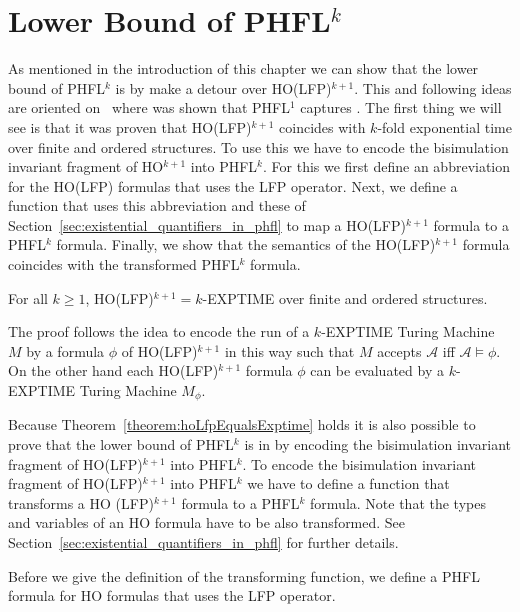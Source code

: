 
\section{Lower Bound of PHFL$^k$}\label{sec:lowerBoundOfPhfl}

As mentioned in the introduction of this chapter we can show that the lower bound of PHFL$^k$ is  by
make a detour over HO(LFP)$^{k+1}$. This and following ideas are oriented on~\cite{lange2014capturing} where was
shown that PHFL$^1$ captures . The first thing we will see is that it was proven that HO(LFP)$^{k +
1}$ coincides with $k$-fold exponential time over finite and ordered structures. To use this we have to encode the
bisimulation invariant fragment of HO$^{k+1}$ into PHFL$^k$. For this we first define an abbreviation for the HO(LFP)
formulas that uses the LFP operator. Next, we define a function that uses this abbreviation and these of
Section~\ref{sec:existential_quantifiers_in_phfl} to map a HO(LFP)$^{k+1}$ formula to a PHFL$^k$ formula. Finally, we
show that the semantics of the HO(LFP)$^{k+1}$ formula coincides with the transformed PHFL$^k$ formula.

\begin{theorem}{\cite{freireMartins2011descriptive}}\label{theorem:hoLfpEqualsExptime}
    For all $k \geq 1$, HO(LFP)$^{k + 1} = k$-EXPTIME over finite and ordered structures.
\end{theorem}

The proof follows the idea to encode the run of a $k$-EXPTIME Turing Machine $M$ by a formula $\phi$ of HO(LFP)$^{k +
1}$ in this way such that $M$ accepts $\mathcal{A}$ iff $\mathcal{A} \models \phi$. On the other hand each HO(LFP)$^{k +
1}$ formula $\phi$ can be evaluated by a $k$-EXPTIME Turing Machine $M_\phi$.

Because Theorem~\ref{theorem:hoLfpEqualsExptime} holds it is also possible to prove that the lower bound of PHFL$^k$
is in  by encoding the bisimulation invariant fragment of HO(LFP)$^{k + 1}$ into PHFL$^k$. To encode the
bisimulation invariant fragment of HO(LFP)$^{k + 1}$ into PHFL$^k$ we have to define a function that transforms a HO
(LFP)$^{k + 1}$ formula to a PHFL$^k$ formula. Note that the types and variables of an HO formula have to be also
transformed. See Section~\ref{sec:existential_quantifiers_in_phfl} for further details.

Before we give the definition of the transforming function, we define a PHFL formula for HO formulas that uses the
LFP operator.

